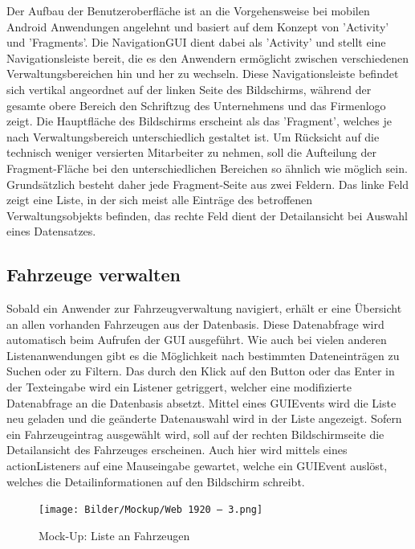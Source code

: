Der Aufbau der Benutzeroberfläche ist an die Vorgehensweise bei mobilen Android Anwendungen angelehnt und basiert auf dem Konzept von 'Activity' und 'Fragments'. 
Die NavigationGUI dient dabei als 'Activity' und stellt eine Navigationsleiste bereit, die es den Anwendern ermöglicht zwischen verschiedenen Verwaltungsbereichen hin und her zu wechseln. 
Diese Navigationsleiste befindet sich vertikal angeordnet auf der linken Seite des Bildschirms, während der gesamte obere Bereich den Schriftzug des Unternehmens und das Firmenlogo zeigt. 
Die Hauptfläche des Bildschirms erscheint als das 'Fragment', welches je nach Verwaltungsbereich unterschiedlich gestaltet ist. 
Um Rücksicht auf die technisch weniger versierten Mitarbeiter zu nehmen, soll die Aufteilung der Fragment-Fläche bei den unterschiedlichen Bereichen so ähnlich wie möglich sein.
Grundsätzlich besteht daher jede Fragment-Seite aus zwei Feldern.
Das linke Feld zeigt eine Liste, in der sich meist alle Einträge des betroffenen Verwaltungsobjekts befinden, das rechte Feld dient der Detailansicht bei Auswahl eines Datensatzes. 

\subsection{Fahrzeuge verwalten}

Sobald ein Anwender zur Fahrzeugverwaltung navigiert, erhält er eine Übersicht an allen vorhanden Fahrzeugen aus der Datenbasis. 
Diese Datenabfrage wird automatisch beim Aufrufen der GUI ausgeführt. 
Wie auch bei vielen anderen Listenanwendungen gibt es die Möglichkeit nach bestimmten Dateneinträgen zu Suchen oder zu Filtern. 
Das durch den Klick auf den Button oder das Enter in der Texteingabe wird ein Listener getriggert, welcher eine modifizierte Datenabfrage an die Datenbasis absetzt.
Mittel eines GUIEvents wird die Liste neu geladen und die geänderte Datenauswahl wird in der Liste angezeigt. 
Sofern ein Fahrzeugeintrag ausgewählt wird, soll auf der rechten Bildschirmseite die Detailansicht des Fahrzeuges erscheinen. 
Auch hier wird mittels eines actionListeners auf eine Mauseingabe gewartet, welche ein GUIEvent auslöst, welches die Detailinformationen auf den Bildschirm schreibt. 

\newpage

\begin{figure}[!ht]
    \centering
    \texttt{[image: Bilder/Mockup/Web 1920 – 3.png]}
    \caption{Mock-Up: Liste an Fahrzeugen}
    \label{mu:fahrzeugliste}
\end{figure}


